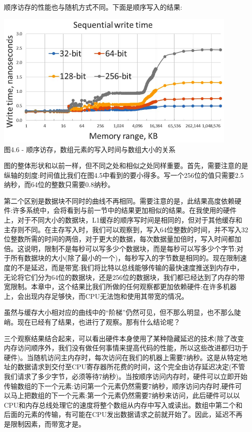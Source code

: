 顺序访存的性能也与随机方式不同。下面是顺序写入的结果:

\begin{center}
\includegraphics[width=0.9\textwidth]{content/1/chapter4/images/6.jpg}\\
图4.6 - 顺序访存，数组元素的写入时间与数组大小的关系
\end{center}

图的整体形状和以前一样，但不同之处和相似之处同样重要。首先，需要注意的是纵轴的刻度:时间值比我们在图4.5中看到的要小得多。写一个256位的值只需要2.5纳秒，而64位的整数只需要0.8纳秒。

第二个区别是数据块不同时的曲线不再相同。需要注意的是，此结果高度依赖硬件:许多系统中，会将看到与前一节中的结果更加相似的结果。在我使用的硬件上，对于不同大小的数据块，L1缓存的顺序写时间是相同的，但对于其他缓存和主存则不同。在主存写入时，我们可以观察到，写入64位整数的时间，并不写入32位整数所需的时间的两倍，对于更大的数据，每次数据量加倍时，写入时间都加倍。这说明，限制不是每秒可以写多少个数据块，而是每秒可以写多少个字节:对于所有数据块的大小(除了最小的一个)，每秒写入的字节数是相同的。现在限制速度的不是延迟，而是带宽:我们将比特以总线能够传输的最快速度推送到内存中，无论将它们分为64位的数据块，还是256位的数据块，我们都已经达到了内存的带宽限制。本章中，这个结果比我们所做的任何观察都更加依赖硬件:在许多机器上，会出现内存足够快，而CPU无法饱和使用其带宽的情况。

虽然与缓存大小相对应的曲线中的“阶梯”仍然可见，但不那么明显，也不那么陡峭。现在已经有了结果，也进行了观察。那有什么结论呢？


三个观察结果结合起来，可以看出硬件本身使用了某种隐藏延迟的技术(除了改变内存访问顺序外，我们没有做任何事情来提高代码的性能，所以这些改进都归功于硬件)。当随机访问主内存时，每次访问在我们的机器上需要7纳秒。这是从特定地址的数据请求到交付至CPU寄存器所花费的时间，这个完全由访存延迟决定(不管我们请求了多少字节，必须等待7纳秒)。当按顺序访问内存时，硬件可以立即开始传输数组的下一个元素:访问第一个元素仍然需要7纳秒，顺序访问内存时,硬件可以马上把数组的下一个元素:第一个元素仍然需要7纳秒来访问，此后硬件可以以CPU和内存总线处理它的速度将整个数组从内存中写入或读出。数组中第二个和后面的元素的传输，有可能在CPU发出数据请求之前就开始了。因此，延迟不再是限制因素，而带宽才是。


